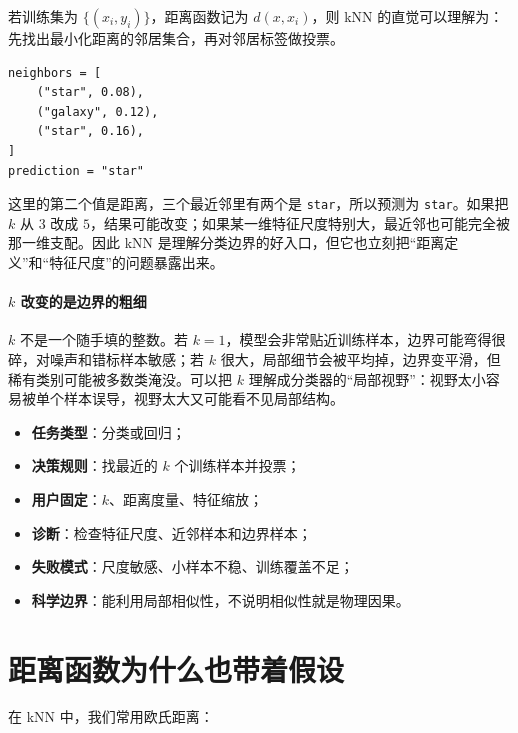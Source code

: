 若训练集为 $\{(x_i, y_i)\}$，距离函数记为 $d(x, x_i)$，则 kNN 的直觉可以理解为：先找出最小化距离的邻居集合，再对邻居标签做投票。

\begin{examplebox}
\begin{lstlisting}[style=pythonstyle]
neighbors = [
    ("star", 0.08),
    ("galaxy", 0.12),
    ("star", 0.16),
]
prediction = "star"
\end{lstlisting}
\end{examplebox}

这里的第二个值是距离，三个最近邻里有两个是 \texttt{star}，所以预测为 \texttt{star}。如果把 $k$ 从 $3$ 改成 $5$，结果可能改变；如果某一维特征尺度特别大，最近邻也可能完全被那一维支配。因此 kNN 是理解分类边界的好入口，但它也立刻把“距离定义”和“特征尺度”的问题暴露出来。

\paragraph{\texorpdfstring{\(k\)}{k} 改变的是边界的粗细}

\(k\) 不是一个随手填的整数。若 \(k=1\)，模型会非常贴近训练样本，边界可能弯得很碎，对噪声和错标样本敏感；若 \(k\) 很大，局部细节会被平均掉，边界变平滑，但稀有类别可能被多数类淹没。可以把 \(k\) 理解成分类器的“局部视野”：视野太小容易被单个样本误导，视野太大又可能看不见局部结构。

\begin{examplebox}
\begin{itemize}
    \item \textbf{任务类型}：分类或回归；
    \item \textbf{决策规则}：找最近的 \(k\) 个训练样本并投票；
    \item \textbf{用户固定}：\(k\)、距离度量、特征缩放；
    \item \textbf{诊断}：检查特征尺度、近邻样本和边界样本；
    \item \textbf{失败模式}：尺度敏感、小样本不稳、训练覆盖不足；
    \item \textbf{科学边界}：能利用局部相似性，不说明相似性就是物理因果。
\end{itemize}
\end{examplebox}

\section{距离函数为什么也带着假设}

在 kNN 中，我们常用欧氏距离：

